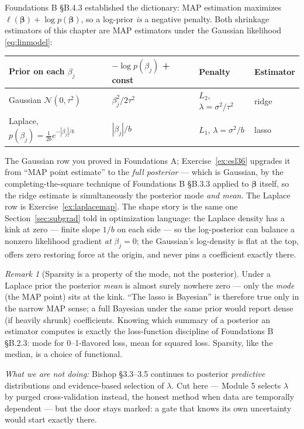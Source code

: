 \documentclass[11pt]{article}
\numberwithin{equation}{section}
\theoremstyle{plain}
\theoremstyle{definition}
\theoremstyle{remark}
\newtheorem{remark}[theorem]{Remark}
\newcommand{\Normal}{\mathcal{N}}
\newcommand{\bbeta}{\bm{\beta}}
\begin{document}
Foundations B \S B.4.3 established the dictionary: MAP estimation maximizes $\ell(\bbeta) + \log p(\bbeta)$, so a log-prior \emph{is} a negative penalty. Both shrinkage estimators of this chapter are MAP estimators under the Gaussian likelihood \eqref{eq:linmodel}:

\begin{center}
\small
\begin{tabular}{@{}llll@{}}
\toprule
Prior on each $\beta_j$ & $-\log p(\beta_j)$ + const & Penalty & Estimator \\
\midrule
Gaussian $\Normal(0, \tau^2)$ & $\beta_j^2 / 2\tau^2$ & $L_2$, $\lambda = \sigma^2/\tau^2$ & ridge \\
Laplace, $p(\beta_j) = \tfrac{1}{2b} e^{-|\beta_j|/b}$ & $|\beta_j| / b$ & $L_1$, $\lambda = \sigma^2/b$ & lasso \\
\bottomrule
\end{tabular}
\end{center}

The Gaussian row you proved in Foundations A; Exercise~\ref{ex:esl36} upgrades it from ``MAP point estimate'' to the \emph{full posterior} --- which is Gaussian, by the completing-the-square technique of Foundations B \S B.3.3 applied to $\bbeta$ itself, so the ridge estimate is simultaneously the posterior mode \emph{and mean}. The Laplace row is Exercise~\ref{ex:laplacemap}. The shape story is the same one Section~\ref{sec:subgrad} told in optimization language: the Laplace density has a kink at zero --- finite slope $1/b$ on each side --- so the log-posterior can balance a nonzero likelihood gradient \emph{at} $\beta_j = 0$; the Gaussian's log-density is flat at the top, offers zero restoring force at the origin, and never pins a coefficient exactly there.

\begin{remark}[Sparsity is a property of the mode, not the posterior]
Under a Laplace prior the posterior \emph{mean} is almost surely nowhere zero --- only the \emph{mode} (the MAP point) sits at the kink. ``The lasso is Bayesian'' is therefore true only in the narrow MAP sense; a full Bayesian under the same prior would report dense (if heavily shrunk) coefficients. Knowing which summary of a posterior an estimator computes is exactly the loss-function discipline of Foundations B \S B.2.3: mode for 0--1-flavored loss, mean for squared loss. Sparsity, like the median, is a choice of functional.
\end{remark}

\emph{What we are not doing:} Bishop \S3.3--3.5 continues to posterior \emph{predictive} distributions and evidence-based selection of $\lambda$. Cut here --- Module 5 selects $\lambda$ by purged cross-validation instead, the honest method when data are temporally dependent --- but the door stays marked: a gate that knows its own uncertainty would start exactly there.
\end{document}
